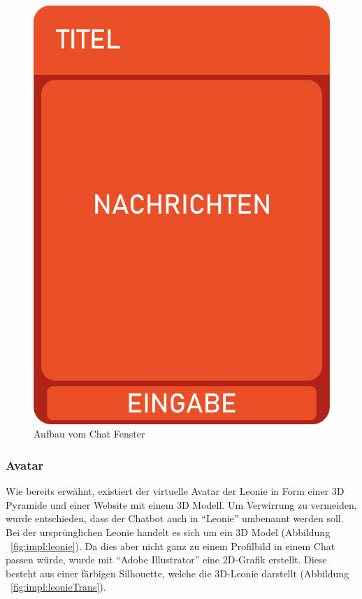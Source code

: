 \begin{figure}[hbt!]
    \centering
    \includegraphics[scale=0.4]{pics/chatWidgetStructure}
    \caption{Aufbau vom Chat Fenster}
    \label{fig:impl:chatWidget}
\end{figure}

\subsubsection{Avatar}
Wie bereits erwähnt, existiert der virtuelle Avatar der Leonie in Form einer 3D Pyramide und einer Website mit einem 3D Modell.
Um Verwirrung zu vermeiden, wurde entschieden, dass der Chatbot auch in ``Leonie'' umbenannt werden soll.
Bei der ursprünglichen Leonie handelt es sich um ein 3D Model (Abbildung ~\ref{fig:impl:leonie}).
Da dies aber nicht ganz zu einem Profilbild in einem Chat passen würde, wurde mit ``Adobe Illustrator'' eine 2D-Grafik erstellt.
Diese besteht aus einer färbigen Silhouette, welche die 3D-Leonie darstellt (Abbildung ~\ref{fig:impl:leonieTrans}).

